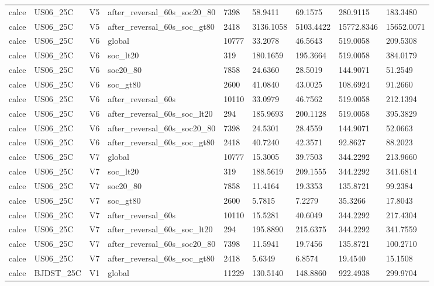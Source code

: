 \begin{tabular}{lllllllll}
calce & US06\_25C & V5 & after\_reversal\_60s\_soc20\_80 & 7398 & 58.9411 & 69.1575 & 280.9115 & 183.3480 \\
calce & US06\_25C & V5 & after\_reversal\_60s\_soc\_gt80 & 2418 & 3136.1058 & 5103.4422 & 15772.8346 & 15652.0071 \\
calce & US06\_25C & V6 & global & 10777 & 33.2078 & 46.5643 & 519.0058 & 209.5308 \\
calce & US06\_25C & V6 & soc\_lt20 & 319 & 180.1659 & 195.3664 & 519.0058 & 384.0179 \\
calce & US06\_25C & V6 & soc20\_80 & 7858 & 24.6360 & 28.5019 & 144.9071 & 51.2549 \\
calce & US06\_25C & V6 & soc\_gt80 & 2600 & 41.0840 & 43.0025 & 108.6924 & 91.2660 \\
calce & US06\_25C & V6 & after\_reversal\_60s & 10110 & 33.0979 & 46.7562 & 519.0058 & 212.1394 \\
calce & US06\_25C & V6 & after\_reversal\_60s\_soc\_lt20 & 294 & 185.9693 & 200.1128 & 519.0058 & 395.3829 \\
calce & US06\_25C & V6 & after\_reversal\_60s\_soc20\_80 & 7398 & 24.5301 & 28.4559 & 144.9071 & 52.0663 \\
calce & US06\_25C & V6 & after\_reversal\_60s\_soc\_gt80 & 2418 & 40.7240 & 42.3571 & 92.8627 & 88.2023 \\
calce & US06\_25C & V7 & global & 10777 & 15.3005 & 39.7503 & 344.2292 & 213.9660 \\
calce & US06\_25C & V7 & soc\_lt20 & 319 & 188.5619 & 209.1555 & 344.2292 & 341.6814 \\
calce & US06\_25C & V7 & soc20\_80 & 7858 & 11.4164 & 19.3353 & 135.8721 & 99.2384 \\
calce & US06\_25C & V7 & soc\_gt80 & 2600 & 5.7815 & 7.2279 & 35.3266 & 17.8043 \\
calce & US06\_25C & V7 & after\_reversal\_60s & 10110 & 15.5281 & 40.6049 & 344.2292 & 217.4304 \\
calce & US06\_25C & V7 & after\_reversal\_60s\_soc\_lt20 & 294 & 195.8890 & 215.6375 & 344.2292 & 341.7559 \\
calce & US06\_25C & V7 & after\_reversal\_60s\_soc20\_80 & 7398 & 11.5941 & 19.7456 & 135.8721 & 100.2710 \\
calce & US06\_25C & V7 & after\_reversal\_60s\_soc\_gt80 & 2418 & 5.6349 & 6.8574 & 19.4540 & 15.1508 \\
calce & BJDST\_25C & V1 & global & 11229 & 130.5140 & 148.8860 & 922.4938 & 299.9704 \\

\end{tabular}
